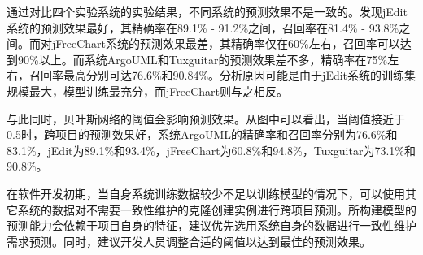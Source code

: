 通过对比四个实验系统的实验结果，不同系统的预测效果不是一致的。发现jEdit系统的预测效果最好，其精确率在89.1\% - 91.2\%之间，召回率在81.4\% - 93.8\%之间。而对jFreeChart系统的预测效果最差，其精确率仅在60\%左右，召回率可以达到90\%以上。而系统ArgoUML和Tuxguitar的预测效果差不多，精确率在75\%左右，召回率最高分别可达76.6\%和90.84\%。分析原因可能是由于jEdit系统的训练集规模最大，模型训练最充分，而jFreeChart则与之相反。

与此同时，贝叶斯网络的阈值会影响预测效果。从图中可以看出，当阈值接近于0.5时，跨项目的预测效果好，系统ArgoUML的精确率和召回率分别为76.6\%和83.1\%，jEdit为89.1\%和93.4\%，jFreeChart为60.8\%和94.8\%，Tuxguitar为73.1\%和90.8\%。

在软件开发初期，当自身系统训练数据较少不足以训练模型的情况下，可以使用其它系统的数据对不需要一致性维护的克隆创建实例进行跨项目预测。所构建模型的预测能力会依赖于项目自身的特征，建议优先选用系统自身的数据进行一致性维护需求预测。同时，建议开发人员调整合适的阈值以达到最佳的预测效果。


